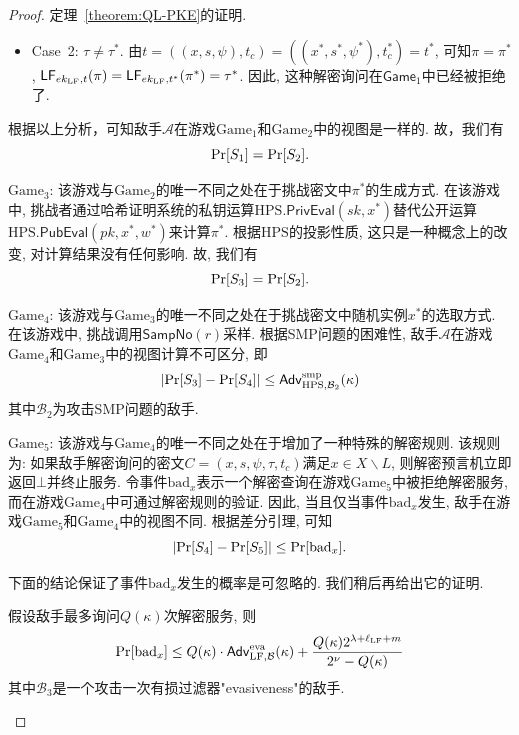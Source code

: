 \begin{proof}{定理~\ref{theorem:QL-PKE}的证明.}
\begin{trivlist}
\begin{itemize}
\item Case~2: $\tau \neq \tau^*$. 由$t=((x,s,\psi),t_c)=((x^*, s^*, \psi^*), t_c^*) = t^*$, 可知$\pi =\pi^*$, $\mathsf{LF}_{ek_{\text{LF}}, t}(\pi) = \mathsf{LF}_{ek_{\text{LF}},t^*}(\pi^*) = \tau^*$. 因此, 这种解密询问在$\mathsf{Game}_1$中已经被拒绝了.
\end{itemize}
根据以上分析，可知敌手$\mathcal{A}$在游戏$\text{Game}_1$和$\text{Game}_2$中的视图是一样的. 故，我们有
\[
\textup{Pr}[S_1]=\textup{Pr}[S_2].
\]

\item $\text{Game}_3$: 该游戏与$\text{Game}_2$的唯一不同之处在于挑战密文中$\pi^*$的生成方式. 在该游戏中, 挑战者通过哈希证明系统的私钥运算$\text{HPS}.\mathsf{PrivEval}(sk, x^*)$替代公开运算$\text{HPS}.\mathsf{PubEval}(pk, x^*, w^*)$来计算$\pi^*$. 根据$\text{HPS}$的投影性质, 这只是一种概念上的改变, 对计算结果没有任何影响. 故, 我们有
\[
\textup{Pr}[S_3]=\textup{Pr}[S_2].
\]

\item $\text{Game}_4$: 该游戏与$\text{Game}_3$的唯一不同之处在于挑战密文中随机实例$x^*$的选取方式. 在该游戏中, 挑战调用$\mathsf{SampNo}(r)$采样. 根据SMP问题的困难性, 敌手$\mathcal{A}$在游戏$\text{Game}_4$和$\text{Game}_3$中的视图计算不可区分, 即
\[
|\textup{Pr}[S_3]-\textup{Pr}[S_4]|\leq\mathsf{Adv}_{\text{HPS},\mathcal{B}_2}^{\textup{smp}}(\kappa)
\]
其中$\mathcal{B}_2$为攻击SMP问题的敌手.

\item $\text{Game}_5$: 该游戏与$\text{Game}_4$的唯一不同之处在于增加了一种特殊的解密规则. 该规则为: 如果敌手解密询问的密文$C=(x,s,\psi,\tau,t_c)$满足$x \in X \backslash L$, 则解密预言机立即返回$\bot$并终止服务. 令事件$\text{bad}_{x}$表示一个解密查询在游戏$\text{Game}_5$中被拒绝解密服务, 而在游戏$\text{Game}_4$中可通过解密规则的验证. 因此, 当且仅当事件$\text{bad}_{x}$发生, 敌手在游戏$\text{Game}_5$和$\text{Game}_4$中的视图不同. 根据差分引理, 可知
\begin{equation*}
|\textup{Pr}[S_4]-\textup{Pr}[S_5]| \leq \textup{Pr}[\text{bad}_{x}].
\end{equation*}

下面的结论保证了事件$\text{bad}_{x}$发生的概率是可忽略的. 我们稍后再给出它的证明.

\begin{lemma}\label{lem:ch5-badx}
假设敌手最多询问$Q(\kappa)$次解密服务, 则
\begin{equation*}
\textup{Pr}[\text{bad}_{x}]\leq Q(\kappa)\cdot\mathsf{Adv}_{\text{LF},\mathcal{B}}^{\textup{eva}}(\kappa)+\dfrac{Q(\kappa)2^{\lambda+\ell_{\text{LF}}+m}}{2^\nu-Q(\kappa)}
\end{equation*}
其中$\mathcal{B}_3$是一个攻击一次有损过滤器"evasiveness"的敌手.
\end{lemma}


\end{trivlist}
\end{proof}
